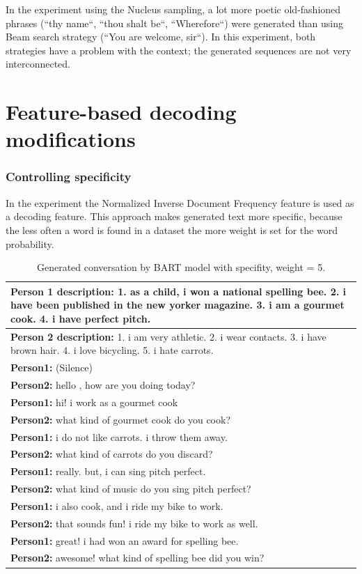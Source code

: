 In the experiment using the Nucleus sampling, a lot more poetic old-fashioned phrases (``thy name``, ``thou shalt be``, ``Wherefore``) were generated than using Beam search strategy (``You are welcome, sir``). In this experiment, both strategies have a problem with the context; the generated sequences are not very interconnected.

\section{Feature-based decoding modifications}
\subsubsection{Controlling specificity}
In the experiment the Normalized Inverse Document Frequency feature is used as a decoding feature. This approach makes generated text more specific, because the less often a word is found in a dataset the more weight is set for the word probability. 

\begin{table}[ht]
 \begin{tabular}{|p{14cm}|}
 \hline
 \textbf{Person 1 description:} 1. as a child, i won a national spelling bee. 2. i have been published in the new yorker magazine. 3. i am a gourmet cook. 4. i have perfect pitch. \\
 \hline
 \textbf{Person 2 description:} 1. i am very athletic. 2. i wear contacts. 3. i have brown hair. 4. i love bicycling. 5. i hate carrots. \\
 \hline
 \textbf{Person1:} (Silence) \\
 \textbf{Person2:} hello , how are you doing today? \\ 
 \textbf{Person1:} hi! i work as a gourmet cook \\
 \textbf{Person2:} what kind of gourmet cook do you cook?\\
 \textbf{Person1:} i do not like carrots. i throw them away.\\
 \textbf{Person2:} what kind of carrots do you discard? \\
 \textbf{Person1:} really. but, i can sing pitch perfect.\\
 \textbf{Person2:} what kind of music do you sing pitch perfect?\\
 \textbf{Person1:} i also cook, and i ride my bike to work.\\
 \textbf{Person2:} that sounds fun! i ride my bike to work as well. \\
 \textbf{Person1:} great! i had won an award for spelling bee. \\
 \textbf{Person2:} awesome! what kind of spelling bee did you win?\\
 \hline
 \end{tabular}
\caption{Generated conversation by BART model with specifity, weight = 5.}
\label{tab:bart_nidf}
\end{table}

